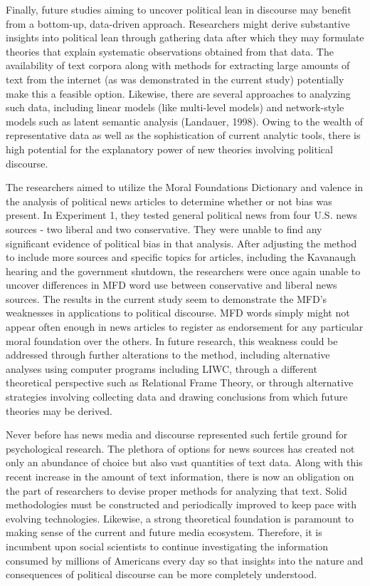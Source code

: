 \documentclass[english,,man]{apa6}
\begin{document}
Finally, future studies aiming to uncover political lean in discourse
may benefit from a bottom-up, data-driven approach. Researchers might
derive substantive insights into political lean through gathering data
after which they may formulate theories that explain systematic
observations obtained from that data. The availability of text corpora
along with methods for extracting large amounts of text from the
internet (as was demonstrated in the current study) potentially make
this a feasible option. Likewise, there are several approaches to
analyzing such data, including linear models (like multi-level models)
and network-style models such as latent semantic analysis (Landauer,
1998). Owing to the wealth of representative data as well as the
sophistication of current analytic tools, there is high potential for
the explanatory power of new theories involving political discourse.

The researchers aimed to utilize the Moral Foundations Dictionary and
valence in the analysis of political news articles to determine whether
or not bias was present. In Experiment 1, they tested general political
news from four U.S. news sources - two liberal and two conservative.
They were unable to find any significant evidence of political bias in
that analysis. After adjusting the method to include more sources and
specific topics for articles, including the Kavanaugh hearing and the
government shutdown, the researchers were once again unable to uncover
differences in MFD word use between conservative and liberal news
sources. The results in the current study seem to demonstrate the MFD's
weaknesses in applications to political discourse. MFD words simply
might not appear often enough in news articles to register as
endorsement for any particular moral foundation over the others. In
future research, this weakness could be addressed through further
alterations to the method, including alternative analyses using computer
programs including LIWC, through a different theoretical perspective
such as Relational Frame Theory, or through alternative strategies
involving collecting data and drawing conclusions from which future
theories may be derived.

Never before has news media and discourse represented such fertile
ground for psychological research. The plethora of options for news
sources has created not only an abundance of choice but also vast
quantities of text data. Along with this recent increase in the amount
of text information, there is now an obligation on the part of
researchers to devise proper methods for analyzing that text. Solid
methodologies must be constructed and periodically improved to keep pace
with evolving technologies. Likewise, a strong theoretical foundation is
paramount to making sense of the current and future media ecosystem.
Therefore, it is incumbent upon social scientists to continue
investigating the information consumed by millions of Americans every
day so that insights into the nature and consequences of political
discourse can be more completely understood.
\end{document}
